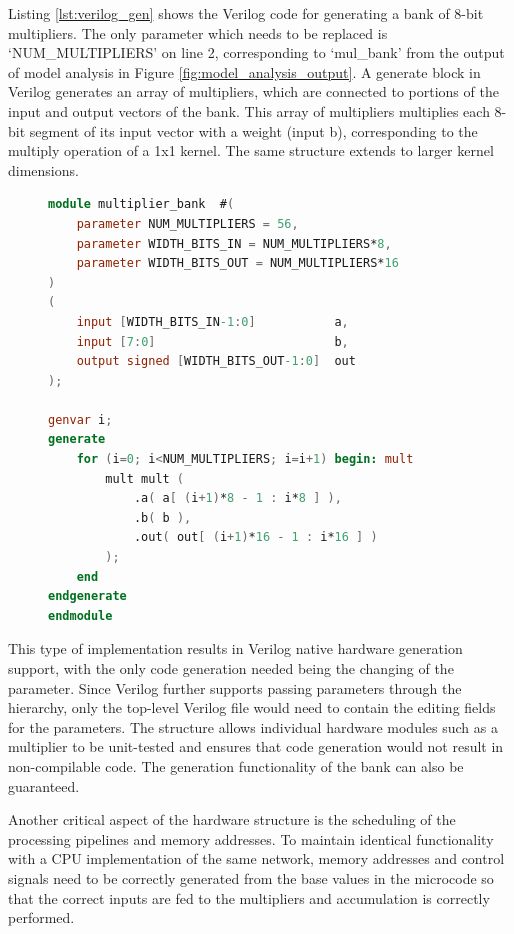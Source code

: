 \documentclass{uw-ece-wkrpt}
\begin{document}
Listing \ref{lst:verilog_gen} shows the Verilog code for generating a bank of 8-bit multipliers. The only parameter which needs to be replaced is `NUM\_MULTIPLIERS' on line 2, corresponding to `mul\_bank' from the output of model analysis in Figure \ref{fig:model_analysis_output}. A generate block in Verilog generates an array of multipliers, which are connected to portions of the input and output vectors of the bank. This array of multipliers multiplies each 8-bit segment of its input vector with a \gls{weight} (input b), corresponding to the multiply operation of a 1x1 \gls{kernel}. The same structure extends to larger \gls{kernel} dimensions.

\begin{figure}
\centering
\begin{lstlisting}[caption={Verilog compile-time generation}, label=lst:verilog_gen, language=Verilog]
module multiplier_bank  #(
    parameter NUM_MULTIPLIERS = 56,
    parameter WIDTH_BITS_IN = NUM_MULTIPLIERS*8,
    parameter WIDTH_BITS_OUT = NUM_MULTIPLIERS*16
)
(
    input [WIDTH_BITS_IN-1:0]           a,
    input [7:0]                         b,
    output signed [WIDTH_BITS_OUT-1:0]  out
);

genvar i;
generate
    for (i=0; i<NUM_MULTIPLIERS; i=i+1) begin: mult
        mult mult (
            .a( a[ (i+1)*8 - 1 : i*8 ] ),
            .b( b ),
            .out( out[ (i+1)*16 - 1 : i*16 ] )
        );
    end
endgenerate
endmodule
\end{lstlisting}
\end{figure}

This type of implementation results in Verilog native hardware generation support, with the only code generation needed being the changing of the parameter. Since Verilog further supports passing parameters through the hierarchy, only the top-level Verilog file would need to contain the editing fields for the parameters. The structure allows individual hardware modules such as a multiplier to be unit-tested and ensures that code generation would not result in non-compilable code. The generation functionality of the bank can also be guaranteed.

Another critical aspect of the hardware structure is the scheduling of the processing pipelines and memory addresses. To maintain identical functionality with a CPU implementation of the same network, memory addresses and control signals need to be correctly generated from the base values in the microcode so that the correct inputs are fed to the multipliers and accumulation is correctly performed.
\end{document}

